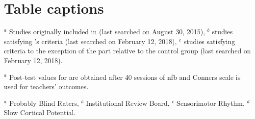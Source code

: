 \section*{Table captions}

\begin{table}[h!]
  \centering
  \caption{List of all studies included in the three different analyses.}
  
	\begin{tablenotes}
	\item $^a$ Studies originally included in \citet{Cortese2016}
	(last searched on August 30, 2015), $^b$ studies satisfying \citet{Cortese2016}'s criteria (last searched on February 12, 2018), $^c$ studies 
	satisfying \citet{Cortese2016} criteria to the exception of the part relative to the control group (last searched on February 12, 2018).
	\end{tablenotes}
  \label{Table:table_factors_analysis_meta_analysis_list_studies}
\end{table}

\begin{table}[h!]
  \centering
  \caption{Comparison between \citet{Cortese2016} results obtained with RevMan \citep{RevMan} and those obtained with the \textcolor{red}{meta-analysis package} with our 
	choices$^a$ applied.  (\glspl{se}) and their corresponding p-value (in parenthesis) are presented. With the \textcolor{red}{meta-analysis package}, a negative \gls{se}
	is in favor of  unlike \citeauthor{Cortese2016}.}
  
	\begin{tablenotes}
	\item $^a$ Post-test values for \citeauthor{Arnold2014} are obtained after 40 sessions of \gls{nfb} and Conners scale is used for \citeauthor{Steiner2014}
	teachers' outcomes.
	\end{tablenotes}
  \label{Table:meta_review_comparison_revman_and_python_with_choices}
\end{table}

\begin{table}[h!]
  \centering
  \caption{Results of the , \gls{lasso} and decision tree. For the \gls{wls}, a p-value $<$ 0.05 (in bold) means that the coefficient of 
	the corresponding factor is significantly different from 0. For the \gls{lasso}, factors not set to 0 (in bold) are selected. For the decision tree,
	the place of the factor in the tree is \textcolor{red}{indicated}. For the first two columns, when the value of the coefficient is negative, the corresponding factor may lead to better  results.}
  
	\begin{tablenotes}
	\begin{footnotesize}
	\item $^a$ Probably Blind Raters, $^b$ Institutional Review Board, $^c$ Sensorimotor Rhythm, $^d$ Slow Cortical Potential.
	\end{footnotesize}
	\end{tablenotes}
  \label{Table:table_factors_analysis_results_summary}
\end{table}